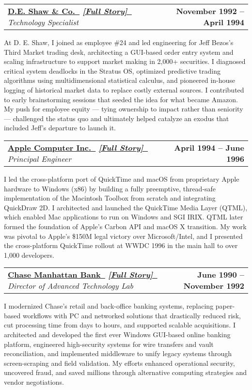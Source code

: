 \documentclass[letterpaper,11pt]{article}
\makeatletter
\newcommand{\resumeItem}[1]{
    \item\small{
            {#1 \vspace{-2pt}}
    }
}
\newcommand{\resumeSubheading}[4]{
    \vspace{-2pt}\item
    \begin{tabular*}{1.0\textwidth}[t]{l@{\extracolsep{\fill}}r}
    \textbf{#1}  \textit{\small#3} & \textbf{\small #2} \\
    \end{tabular*}\vspace{-7pt}
}
\makeatother
\begin{document}
\resumeSubheading
{\href{https://www.deshaw.com}{D.E. Shaw \& Co.~\faExternalLink}
\quad\small
\textit
{\href {https://paul-charlton.vercel.app/story/25}{[Full Story]~{\fontspec{Symbola}\symbol{"1F517}}}}
}
{November 1992 -- April 1994}
{Technology Specialist}
{New York, NY}
\resumeItem{
At D. E. Shaw, I joined as employee \#24 and led engineering for Jeff Bezos’s Third Market trading desk, architecting a GUI-based order entry system and scaling infrastructure to support market making in 2,000+ securities. I diagnosed critical system deadlocks in the Stratus OS, optimized predictive trading algorithms using multidimensional statistical calculus, and pioneered in-house logging of historical market data to replace costly external sources. I contributed to early brainstorming sessions that seeded the idea for what became Amazon. My push for employee equity — tying ownership to impact rather than seniority — challenged the status quo and ultimately helped catalyze an exodus that included Jeff’s departure to launch it.
}

\resumeSubheading
{\href{https://www.apple.com}{Apple Computer Inc.~\faExternalLink}
\quad\small
\textit
{\href{https://paul-charlton.vercel.app/story/11}{[Full Story]~{\fontspec{Symbola}\symbol{"1F517}}}}
}
{April 1994 -- June 1996}
{Principal Engineer}
{Cupertino, CA}
\resumeItem{
I led the cross-platform port of QuickTime and macOS from proprietary Apple hardware to Windows (x86) by building a fully preemptive, thread-safe implementation of the Macintosh Toolbox from scratch and integrating QuickDraw 2D. I architected and launched the QuickTime Media Layer (QTML), which enabled Mac applications to run on Windows and SGI IRIX. QTML later formed the foundation of Apple’s Carbon API and macOS X transition. My work was pivotal to Apple’s \$150M legal victory over Microsoft/Intel, and I presented the cross-platform QuickTime rollout at WWDC 1996 in the main hall to over 1,000 developers.
}

\resumeSubheading
{\href{https://www.chase.com}{Chase Manhattan Bank~\faExternalLink}
\quad\small
\textit{
\href{https://paul-charlton.vercel.app/story/17}{[Full Story]~{\fontspec{Symbola}\symbol{"1F517}}}}
}
{June 1990 -- November 1992}
{Director of Advanced Technology Lab}
{New York, NY}
\resumeItem{
I modernized Chase’s retail and back-office banking systems, replacing paper-based workflows with PC and networked solutions that drastically reduced risk, cut processing time from days to hours, and supported scalable acquisitions. I architected and developed the first ever Windows GUI-based online banking platform, engineered high-security systems for wire transfers and vault reconciliation, and implemented middleware to unify legacy systems through screen-scraping and field validation. My efforts enhanced operational security, uncovered fraud, and saved millions through alternative computing strategies and vendor negotiations.
}
\end{document}
